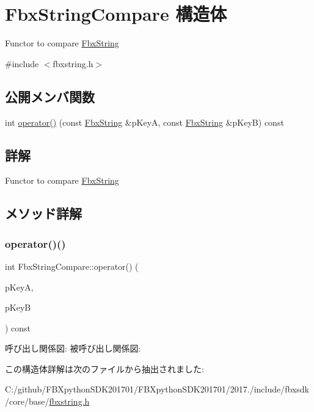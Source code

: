 \hypertarget{struct_fbx_string_compare}{}\section{Fbx\+String\+Compare 構造体}
\label{struct_fbx_string_compare}


Functor to compare \hyperlink{class_fbx_string}{Fbx\+String}  




{\ttfamily \#include $<$fbxstring.\+h$>$}

\subsection*{公開メンバ関数}
\begin{DoxyCompactItemize}
\item 
int \hyperlink{struct_fbx_string_compare_a3dd785a940f883203d4ad15c9204e47f}{operator()} (const \hyperlink{class_fbx_string}{Fbx\+String} \&p\+KeyA, const \hyperlink{class_fbx_string}{Fbx\+String} \&p\+KeyB) const
\end{DoxyCompactItemize}


\subsection{詳解}
Functor to compare \hyperlink{class_fbx_string}{Fbx\+String} 

\subsection{メソッド詳解}
\mbox{\label{struct_fbx_string_compare_a3dd785a940f883203d4ad15c9204e47f}} 
\subsubsection{\texorpdfstring{operator()()}{operator()()}}
{\footnotesize\ttfamily int Fbx\+String\+Compare\+::operator() (\begin{DoxyParamCaption}\item[{const \hyperlink{class_fbx_string}{Fbx\+String} \&}]{p\+KeyA,  }\item[{const \hyperlink{class_fbx_string}{Fbx\+String} \&}]{p\+KeyB }\end{DoxyParamCaption}) const}

呼び出し関係図\+:
被呼び出し関係図\+:


この構造体詳解は次のファイルから抽出されました\+:\begin{DoxyCompactItemize}
\item 
C\+:/github/\+F\+B\+Xpython\+S\+D\+K201701/\+F\+B\+Xpython\+S\+D\+K201701/2017./include/fbxsdk/core/base/\hyperlink{fbxstring_8h}{fbxstring.\+h}\end{DoxyCompactItemize}
